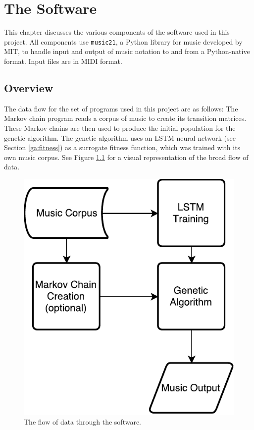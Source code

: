 \chapter{The Software} \label{software}

This chapter discusses the various components of the software used in this project.
All components use \texttt{music21}, a Python library for music developed by MIT, to handle input and output of music notation to and from a Python-native format.
Input files are in MIDI format.

\section{Overview} \label{software:overview}

The data flow for the set of programs used in this project are as follows:
The Markov chain program reads a corpus of music to create its transition matrices.
These Markov chains are then used to produce the initial population for the genetic algorithm.
The genetic algorithm uses an LSTM neural network (see Section \ref{ga:fitness}) as a surrogate fitness function, which was trained with its own music corpus.
See Figure \ref{fig:softwareoverview} for a visual representation of the broad flow of data.

\begin{figure}[h]
	\centering
	\includegraphics{figures/overview_flowchart.pdf}
	\caption{The flow of data through the software.}
	\label{fig:softwareoverview}
\end{figure}

